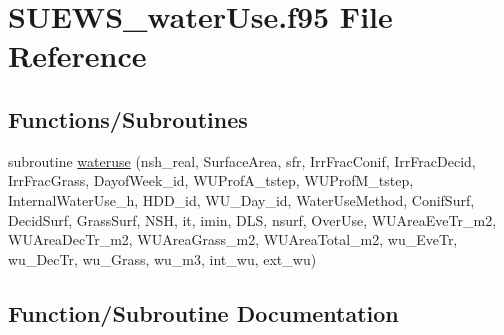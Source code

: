 \hypertarget{_s_u_e_w_s__water_use_8f95}{}\section{S\+U\+E\+W\+S\+\_\+water\+Use.\+f95 File Reference}
\label{_s_u_e_w_s__water_use_8f95}
\subsection*{Functions/\+Subroutines}
\begin{DoxyCompactItemize}
\item 
subroutine \hyperlink{_s_u_e_w_s__water_use_8f95_a2de7209275154fbb61e2f22a1d4a1d38}{wateruse} (nsh\+\_\+real, Surface\+Area, sfr, Irr\+Frac\+Conif, Irr\+Frac\+Decid, Irr\+Frac\+Grass, Dayof\+Week\+\_\+id, W\+U\+Prof\+A\+\_\+tstep, W\+U\+Prof\+M\+\_\+tstep, Internal\+Water\+Use\+\_\+h, H\+D\+D\+\_\+id, W\+U\+\_\+\+Day\+\_\+id, Water\+Use\+Method, Conif\+Surf, Decid\+Surf, Grass\+Surf, N\+SH, it, imin, D\+LS, nsurf, Over\+Use, W\+U\+Area\+Eve\+Tr\+\_\+m2, W\+U\+Area\+Dec\+Tr\+\_\+m2, W\+U\+Area\+Grass\+\_\+m2, W\+U\+Area\+Total\+\_\+m2, wu\+\_\+\+Eve\+Tr, wu\+\_\+\+Dec\+Tr, wu\+\_\+\+Grass, wu\+\_\+m3, int\+\_\+wu, ext\+\_\+wu)
\end{DoxyCompactItemize}


\subsection{Function/\+Subroutine Documentation}
\mbox{\label{_s_u_e_w_s__water_use_8f95_a2de7209275154fbb61e2f22a1d4a1d38}} 

